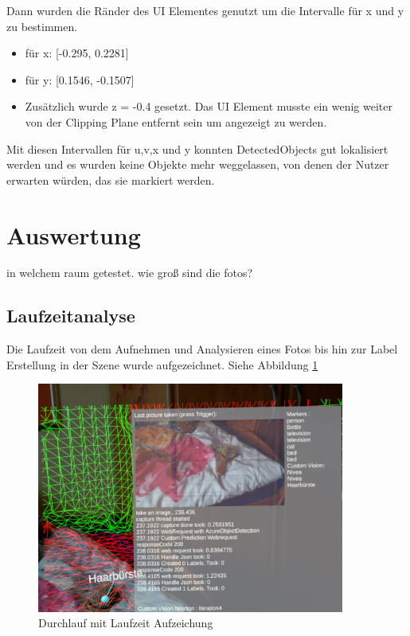 Dann wurden die Ränder des UI Elementes genutzt um die Intervalle für x und y zu bestimmen.
\begin{itemize}
	\item für x: [-0.295, 0.2281]
	\item für y: [0.1546, -0.1507]
	\item Zusätzlich wurde z = -0.4 gesetzt. Das UI Element musste ein wenig weiter von der Clipping Plane entfernt sein um angezeigt zu werden.
\end{itemize}

Mit diesen Intervallen für u,v,x und y konnten DetectedObjects gut lokalisiert werden und es wurden keine Objekte mehr weggelassen, von denen der Nutzer erwarten würden, das sie markiert werden.

\newpage
\section{Auswertung}

in welchem raum getestet. wie groß sind die fotos?

\subsection{Laufzeitanalyse}

Die Laufzeit von dem Aufnehmen und Analysieren eines Fotos bis hin zur Label Erstellung in der Szene wurde aufgezeichnet. Siehe Abbildung \ref{img:laufzeit}

\begin{figure}[H]
	\centering
	\includegraphics[width=0.9\textwidth]{images/ML_20201005_16.12.36.jpg}
	\caption[]{Durchlauf mit Laufzeit Aufzeichung}
	\label{img:laufzeit}
\end{figure}

